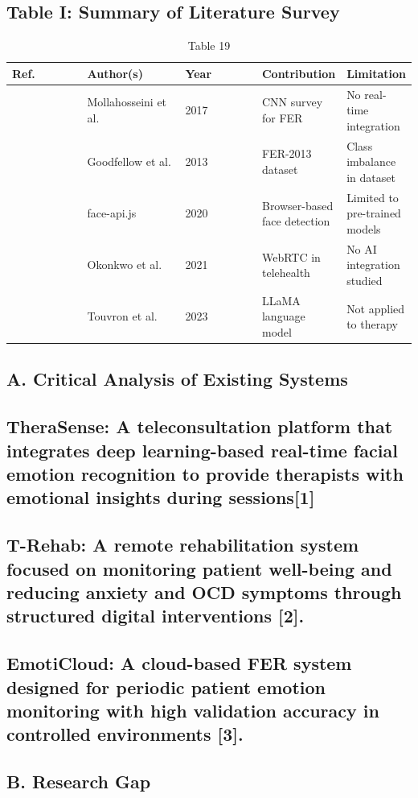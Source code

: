 \documentclass[conference]{IEEEtran}
\begin{document}
\subsection{Table I: Summary of Literature Survey}
\begin{table}[t]
\centering
\caption{Table 19}
\begin{tabular}{|p{0.3\linewidth}|p{0.3\linewidth}|p{0.3\linewidth}|p{0.3\linewidth}|p{0.3\linewidth}|}
\hline
Ref. & Author(s) & Year & Contribution & Limitation \\
\hline
[4] & Mollahosseini et al. & 2017 & CNN survey for FER & No real-time integration \\
\hline
[5] & Goodfellow et al. & 2013 & FER-2013 dataset & Class imbalance in dataset \\
\hline
[7] & face-api.js & 2020 & Browser-based face detection & Limited to pre-trained models \\
\hline
[8] & Okonkwo et al. & 2021 & WebRTC in telehealth & No AI integration studied \\
\hline
[10] & Touvron et al. & 2023 & LLaMA language model & Not applied to therapy \\
\hline
\end{tabular}
\end{table}
\subsection{A. Critical Analysis of Existing Systems}
\subsection{TheraSense: A teleconsultation platform that integrates deep learning-based real-time facial emotion recognition to provide therapists with emotional insights during sessions[1]}
\subsection{T-Rehab: A remote rehabilitation system focused on monitoring patient well-being and reducing anxiety and OCD symptoms through structured digital interventions [2].}
\subsection{EmotiCloud: A cloud-based FER system designed for periodic patient emotion monitoring with high validation accuracy in controlled environments [3].}
\subsection{B. Research Gap}
\end{document}
